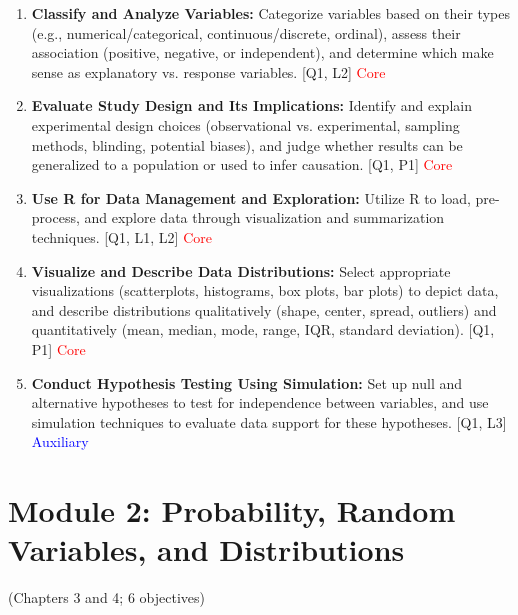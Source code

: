 \documentclass[12pt]{article}
\begin{document}

\begin{enumerate}
    \item \textbf{Classify and Analyze Variables:} Categorize variables based on their types (e.g., numerical/categorical, continuous/discrete, ordinal), assess their association (positive, negative, or independent), and determine which make sense as explanatory vs. response variables. [Q1, L2] \textcolor{red}{Core}
    \item \textbf{Evaluate Study Design and Its Implications:} Identify and explain experimental design choices (observational vs. experimental, sampling methods, blinding, potential biases), and judge whether results can be generalized to a population or used to infer causation. [Q1, P1] \textcolor{red}{Core}
    \item \textbf{Use R for Data Management and Exploration:} Utilize R to load, pre-process, and explore data through visualization and summarization techniques. [Q1, L1, L2] \textcolor{red}{Core}
    \item \textbf{Visualize and Describe Data Distributions:} Select appropriate visualizations (scatterplots, histograms, box plots, bar plots) to depict data, and describe distributions qualitatively (shape, center, spread, outliers) and quantitatively (mean, median, mode, range, IQR, standard deviation). [Q1, P1] \textcolor{red}{Core}
    \item \textbf{Conduct Hypothesis Testing Using Simulation:} Set up null and alternative hypotheses to test for independence between variables, and use simulation techniques to evaluate data support for these hypotheses. [Q1, L3] \textcolor{blue}{Auxiliary}
\end{enumerate}

\newpage


\section{Module 2: Probability, Random Variables, and Distributions}
(Chapters 3 and 4; 6 objectives)

\end{document}
